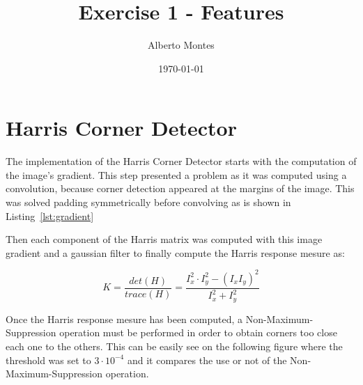 \documentclass{ethz_report}
\title{Exercise 1 - Features}
\author{Alberto Montes}
\date{\today}
\begin{document}
\maketitle

\section{Harris Corner Detector}

The implementation of the Harris Corner Detector starts with the computation of the image's
gradient. This step presented a problem as it was computed using a convolution, because corner
detection appeared at the margins of the image. This was solved padding symmetrically before
convolving as is shown in Listing~\ref{lst:gradient}



Then each component of the Harris matrix was computed with this image gradient and a gaussian filter
to finally compute the Harris response mesure as:

\begin{equation}
    K = \frac{det(H)}{trace(H)} = \frac{I_x^2 \cdot I_y^2 - (I_x I_y)^2}{I_x^2 + I_y^2}
\end{equation}

Once the Harris response mesure has been computed, a Non-Maximum-Suppression operation must be
performed in order to obtain corners too close each one to the others. This can be easily see on the
following figure where the threshold was set to $3 \cdot 10^{-4}$ and it compares the use or not
of the Non-Maximum-Suppression operation.
\end{document}
